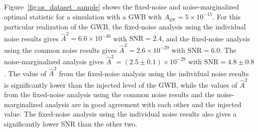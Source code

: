 \documentclass[twocolumn,aps,prd,superscriptaddress]{revtex4-1}
\newcommand{\Agw}{\ensuremath{A_\mathrm{gw}}}
\begin{document}

Figure~\ref{fig:os_dataset_sample} shows the fixed-noise and noise-marginalized 
optimal statistic for a simulation with a GWB with $\Agw=5\times10^{-15}$. 
For this particular realization of the GWB, 
the fixed-noise analysis 
using the individual noise results gives 
$\hat{A}^2 = 6.6\times10^{-30}$ with $\mathrm{SNR} = 2.4$, 
and the fixed-noise analysis using the common noise results gives 
$\hat{A}^2 = 2.6\times10^{-29}$ with $\mathrm{SNR} = 6.0$. 
The noise-marginalized analysis gives $\hat{A}^2 = (2.5 \pm 0.1)\times10^{-29}$ 
with $\mathrm{SNR}=4.8\pm0.8$. 
The value of $\hat{A}^2$ from the fixed-noise analysis using the individual noise results 
is significantly lower than the injected level of the GWB, while 
the values of $\hat{A}^2$ from the fixed-noise analysis using the common noise results 
and the noise-marginalized analysis are in good agreement with each other and the injected value. 
The fixed-noise analysis using the individual noise results also gives a significantly lower SNR 
than the other two. 
\end{document}

